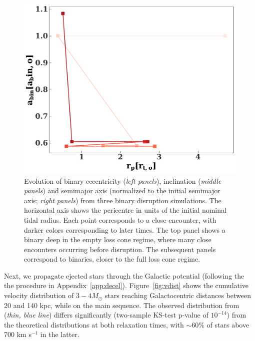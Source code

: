 \documentclass[fleqn,usenatbib]{mnras}
\begin{document}
\begin{figure}
    \includegraphics[width=0.66\columnwidth]{figures/asph_example_1.pdf}
    \caption{Evolution of binary eccentricity (\emph{left panels}), inclination (\emph{middle panels}) and semimajor axis (normalized to the initial semimajor axis; \emph{right panels}) from three binary disruption simulations. The horizontal axis shows the pericentre in units of the initial nominal tidal radius. Each point corresponds to a close encounter, with darker colors corresponding to later times. The top panel shows a binary deep in the empty loss cone regime, where many close encounters occurring before disruption. The subsequent panels correspond to binaries, closer to the full loss cone regime.}
    \label{fig:examples}
\end{figure}

Next, we propagate ejected stars through the Galactic potential (following the the procedure in Appendix~\ref{app:decel}). Figure~\ref{fig:vdist} shows the cumulative velocity distribution of $3-4 M_{\odot}$ stars reaching Galactocentric distances between 20 and 140 kpc, while on the main sequence. 
The observed distribution from \citet{warren_brown+2018} (\emph{thin, blue line}) differs significantly (two-sample KS-test p-value of $10^{-14}$) from the theoretical distributions at both relaxation times,  with $\sim 60\%$ of stars above 700 km s$^{-1}$ in the latter. 
\end{document}
